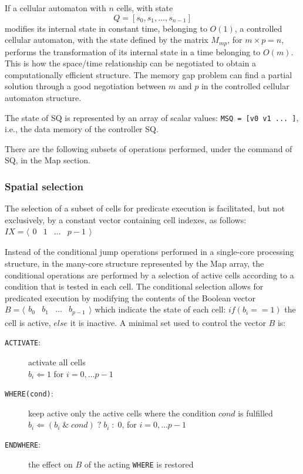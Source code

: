 If a cellular automaton with $n$ cells, with state $$Q = [s_0, s_1, \ldots, s_{n-1}]$$ modifies its internal state in constant time, belonging to $O(1)$, a controlled cellular automaton,  with the state defined by the matrix $M_{mp}$, for $m \times p = n$, performs the transformation of its internal state in a time belonging to $O(m)$. This is how the space/time relationship can be negotiated  to obtain a computationally efficient structure. The memory gap problem  can find a partial solution through a good negotiation between $m$ and $p$ in the controlled cellular automaton structure.

The state of SQ is represented by an array of scalar values: {\tt MSQ = [v0 v1 ... ]}, i.e., the data memory of the controller SQ. 

There are the following subsets of operations performed, under the command of SQ, in the Map section. 

\subsubsection{Spatial selection}

The selection of a subset of cells for predicate execution is facilitated, but not exclusively, by a constant vector containing cell indexes, as follows:
$IX=\langle
\begin{matrix}
0 & 1 & \ldots & p-1
\end{matrix}
\rangle$

Instead of the conditional jump operations performed in a single-core processing structure, in the many-core structure represented by the Map array, the conditional operations are performed by a selection of active cells according to a condition that is tested in each cell. The conditional selection allows for predicated execution by modifying the contents of the Boolean vector 
$B=\langle
\begin{matrix}
b_0 & b_1 & \ldots & b_{p-1}
\end{matrix}
\rangle$ which indicate the state of each cell: $if (b_i == 1)$ the cell is active, $else$ it is inactive. A minimal set used to control the vector $B$ is:
\begin{description}
    \item[{\tt ACTIVATE}:] activate all cells  \\ 
    $b_i \Leftarrow 1$ for $i = 0,  \ldots  p-1$
    \item[{\tt WHERE(cond)}:] keep active only the active cells where the condition $cond$ is fulfilled \\ 
    $b_i \Leftarrow (b_i \; \& \; cond) \; ? \; b_i \; : \; 0$, for $i = 0, \ldots  p-1$
    \item[{\tt ENDWHERE}:]  the effect on $B$ of the acting {\tt WHERE} is restored
\end{description}

